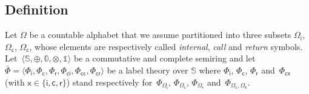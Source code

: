 \documentclass[runningheads]{llncs}
\def\<#1>{\langle #1 \rangle}
\newcommand{\Semiring}{\mathbb{S}}
\newcommand{\zero}{\mathbb{0}}
\newcommand{\one}{\mathbb{1}}
\newcommand{\call}[1]{\ensuremath #1} %
\newcommand{\return}[1]{\ensuremath #1} %
\def\Omegai{{\Omega_\mathsf{i}}}
\def\Omegac{{\Omega_\mathsf{c}}}
\def\Omegar{{\Omega_\mathsf{r}}}
\def\Phii{{\Phi_\mathsf{i}}}
\def\Phic{{\Phi_\mathsf{c}}}
\def\Phir{{\Phi_\mathsf{r}}}
\def\Phici{{\Phi_\mathsf{ci}}}
\def\Phicc{{\Phi_\mathsf{cc}}}
\def\Phicr{{\Phi_\mathsf{cr}}}
\def\Phicx{{\Phi_\mathsf{cx}}}
\begin{document}
\subsection{Definition}
Let $\Omega$ be a countable alphabet 
that we assume partitioned into three subsets 
$\Omegai$, $\Omegac$, $\Omegac$,
whose elements are respectively called 
\emph{internal}, \emph{call} and \emph{return} symbols.
Let~$\< \Semiring, \oplus, \zero, \otimes, \one>$ be a commutative and complete semiring and let  
$\bar\Phi = \< \Phii, \Phic, \Phir, \Phici, \Phicc, \Phicr>$ 
be a label theory over $\Semiring$
where $\Phii$, $\Phic$, $\Phir$ and~$\Phicx$ (with $\mathsf{x} \in \{ \mathsf{i}, \mathsf{c}, \mathsf{r}\}$) 
stand respectively 
for~$\Phi_\Omegai$, $\Phi_\Omegac$, $\Phi_\Omegar$ and~$\Phi_{\Omegac, \Omega_\mathsf{x}}$.
%
\end{document}
